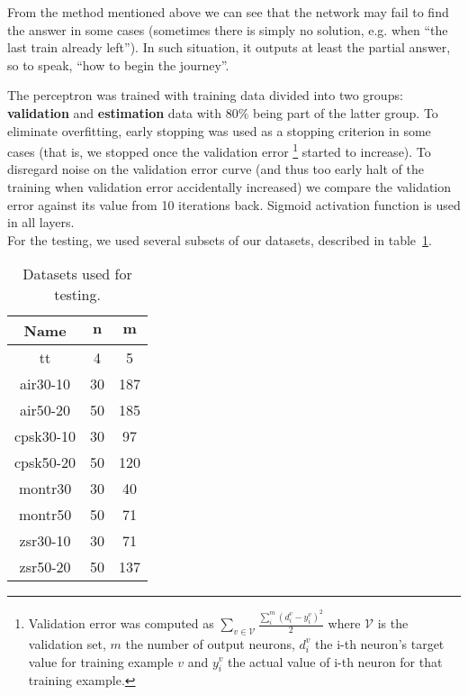 \noindent From the method mentioned above we can see that the network may fail to find the answer in some cases (sometimes there is simply no solution, e.g. when ``the last train already left''). In such situation, it outputs at least the partial answer, so to speak, ``how to begin the journey''.
	
The perceptron was trained with training data divided into two groups: \textbf{validation} and \textbf{estimation} data with $80\%$ being part of the latter group. To eliminate overfitting, early stopping was used as a stopping criterion in some cases (that is, we stopped once the validation error \footnote{Validation error was computed as $\sum_{v \in \mathcal{V}} \frac{\sum_{i}^{m} (d_{i}^{v} - y_{i}^{v})^{2}}{2}$ where $\mathcal{V}$ is the validation set, $m$ the number of output neurons, $d_{i}^{v}$ the i-th neuron's target value for training example $v$ and $y_{i}^{v}$ the actual value of i-th neuron for that training example.} started to increase). To disregard noise on the validation error curve (and thus too early halt of the training when validation error accidentally increased) we compare the validation error against its value from 10 iterations back. Sigmoid activation function is used in all layers.	\\
	
\noindent For the testing, we used several subsets of our datasets, described in table~\ref{tab:datasets}.
	
\begin{table}[h]
	\centering
	\begin{tabular}{c|c|c}
            \rowcolor{tablehead}
            \textbf{Name} & \textbf{$\bm{n}$} & \textbf{$\bm{m}$} \\
            \hline
        	tt & 4 & 5 \\
			air30-10 & 30 & 187 \\
			air50-20 & 50 & 185 \\
			cpsk30-10 & 30 & 97 \\
			cpsk50-20 & 50 & 120 \\
			montr30 & 30 & 40 \\
			montr50 & 50 & 71 \\
			zsr30-10 & 30 & 71 \\
			zsr50-20 & 50 & 137 \\
        \end{tabular}
        \caption{\label{tab:datasets} Datasets used for testing.}
	\normalsize
\end{table} 
	
